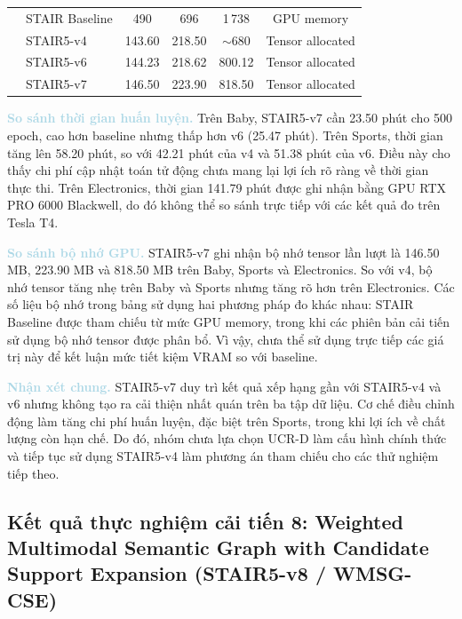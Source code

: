 \begin{table}[!htbp]
{\begin{tabular}{llcccc}
        & STAIR Baseline & 490 & 696 & 1\,738 & GPU memory \\
        & STAIR5-v4 & 143.60 & 218.50 & $\sim$680 & Tensor allocated \\
        & STAIR5-v6 & 144.23 & 218.62 & 800.12 & Tensor allocated \\
        & STAIR5-v7 & 146.50 & 223.90 & 818.50 & Tensor allocated \\

        \bottomrule
    \end{tabular}%
    }
\end{table}

\noindent\textcolor{lightblue}{\textbf{So sánh thời gian huấn luyện.}} Trên Baby, STAIR5-v7 cần 23.50 phút cho 500 epoch, cao hơn baseline nhưng thấp hơn v6 (25.47 phút). Trên Sports, thời gian tăng lên 58.20 phút, so với 42.21 phút của v4 và 51.38 phút của v6. Điều này cho thấy chi phí cập nhật toán tử động chưa mang lại lợi ích rõ ràng về thời gian thực thi. Trên Electronics, thời gian 141.79 phút được ghi nhận bằng GPU RTX PRO 6000 Blackwell, do đó không thể so sánh trực tiếp với các kết quả đo trên Tesla T4.

\noindent\textcolor{lightblue}{\textbf{So sánh bộ nhớ GPU.}} STAIR5-v7 ghi nhận bộ nhớ tensor lần lượt là 146.50 MB, 223.90 MB và 818.50 MB trên Baby, Sports và Electronics. So với v4, bộ nhớ tensor tăng nhẹ trên Baby và Sports nhưng tăng rõ hơn trên Electronics. Các số liệu bộ nhớ trong bảng sử dụng hai phương pháp đo khác nhau: STAIR Baseline được tham chiếu từ mức GPU memory, trong khi các phiên bản cải tiến sử dụng bộ nhớ tensor được phân bổ. Vì vậy, chưa thể sử dụng trực tiếp các giá trị này để kết luận mức tiết kiệm VRAM so với baseline.

\noindent\textcolor{lightblue}{\textbf{Nhận xét chung.}} STAIR5-v7 duy trì kết quả xếp hạng gần với STAIR5-v4 và v6 nhưng không tạo ra cải thiện nhất quán trên ba tập dữ liệu. Cơ chế điều chỉnh động làm tăng chi phí huấn luyện, đặc biệt trên Sports, trong khi lợi ích về chất lượng còn hạn chế. Do đó, nhóm chưa lựa chọn UCR-D làm cấu hình chính thức và tiếp tục sử dụng STAIR5-v4 làm phương án tham chiếu cho các thử nghiệm tiếp theo.

\subsection{Kết quả thực nghiệm cải tiến 8: Weighted Multimodal Semantic Graph with Candidate Support Expansion (STAIR5-v8 / WMSG-CSE)}

